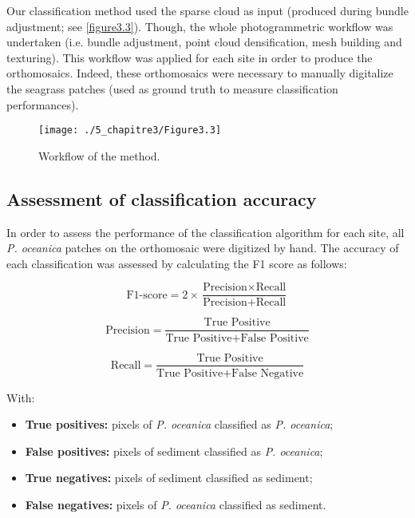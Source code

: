Our classification method used the sparse cloud as input (produced during bundle adjustment; see \autoref{figure3.3}). Though, the whole photogrammetric workflow was undertaken (i.e. bundle adjustment, point cloud densification, mesh building and texturing). This workflow was applied for each site in order to produce the orthomosaics. Indeed, these orthomosaics were necessary to manually digitalize the seagrass patches (used as ground truth to measure classification performances).

\begin{figure}[H]
	\begin{center}
	\texttt{[image: ./5\_chapitre3/Figure3.3]}
		\caption[Workflow of the method.]{Workflow of the method.}
	\label{figure3.3}
\end{center}
\end{figure}

\subsection{Assessment of classification accuracy}
In order to assess the performance of the classification algorithm for each site, all \textit{P. oceanica} patches on the orthomosaic were digitized by hand. The accuracy of each classification was assessed by calculating the F1 score as follows:

\begin{equation}
\text{F1-score}=2\times\frac{\text{Precision}\times\text{Recall}}{\text{Precision}+\text{Recall}}
\end{equation}

\begin{equation}
\text{Precision}=\frac{\text{True Positive}}{\text{True Positive}+\text{False Positive}}
\end{equation}

\begin{equation}
\text{Recall}=\frac{\text{True Positive}}{\text{True Positive}+\text{False Negative}}
\end{equation}

With:

\begin{itemize}
\item \textbf{True positives:} pixels of \textit{P. oceanica} classified as \textit{P. oceanica};
\item \textbf{False positives:} pixels of sediment classified as \textit{P. oceanica};
\item \textbf{True negatives:} pixels of sediment classified as sediment;
\item \textbf{False negatives:} pixels of \textit{P. oceanica} classified as sediment.
\end{itemize}

